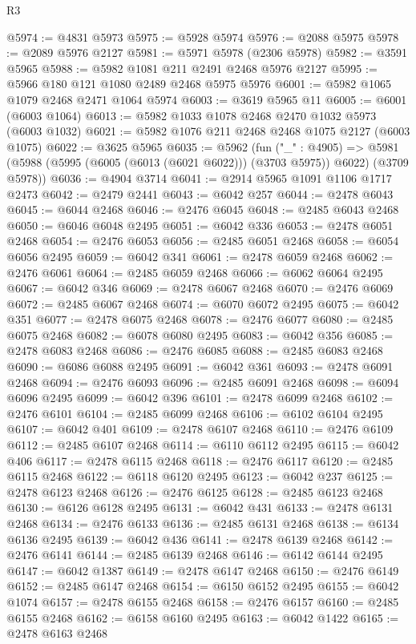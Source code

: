 \begin{lexlean}{R3}
\begin{coremodule}
@5974 := @4831 @5973
@5975 := @5928 @5974
@5976 := @2088 @5975
@5978 := @2089 @5976 @2127
@5981 := @5971 @5978 (@2306 @5978)
@5982 := @3591 @5965
@5988 := @5982 @1081 @211 @2491 @2468 @5976 @2127
@5995 := @5966 @180 @121 @1080 @2489 @2468 @5975 @5976
@6001 := @5982 @1065 @1079 @2468 @2471 @1064 @5974
@6003 := @3619 @5965 @11
@6005 := @6001 (@6003 @1064)
@6013 := @5982 @1033 @1078 @2468 @2470 @1032 @5973 (@6003 @1032)
@6021 := @5982 @1076 @211 @2468 @2468 @1075 @2127 (@6003 @1075)
@6022 := @3625 @5965
@6035 := @5962
    (fun ("_" : @4905) =>
    @5981 (@5988 (@5995 (@6005 (@6013 (@6021 @6022))) (@3703 @5975)) @6022) (@3709 @5978))
@6036 := @4904 @3714
@6041 := @2914 @5965 @1091 @1106 @1717 @2473
@6042 := @2479 @2441
@6043 := @6042 @257
@6044 := @2478 @6043
@6045 := @6044 @2468
@6046 := @2476 @6045
@6048 := @2485 @6043 @2468
@6050 := @6046 @6048 @2495
@6051 := @6042 @336
@6053 := @2478 @6051 @2468
@6054 := @2476 @6053
@6056 := @2485 @6051 @2468
@6058 := @6054 @6056 @2495
@6059 := @6042 @341
@6061 := @2478 @6059 @2468
@6062 := @2476 @6061
@6064 := @2485 @6059 @2468
@6066 := @6062 @6064 @2495
@6067 := @6042 @346
@6069 := @2478 @6067 @2468
@6070 := @2476 @6069
@6072 := @2485 @6067 @2468
@6074 := @6070 @6072 @2495
@6075 := @6042 @351
@6077 := @2478 @6075 @2468
@6078 := @2476 @6077
@6080 := @2485 @6075 @2468
@6082 := @6078 @6080 @2495
@6083 := @6042 @356
@6085 := @2478 @6083 @2468
@6086 := @2476 @6085
@6088 := @2485 @6083 @2468
@6090 := @6086 @6088 @2495
@6091 := @6042 @361
@6093 := @2478 @6091 @2468
@6094 := @2476 @6093
@6096 := @2485 @6091 @2468
@6098 := @6094 @6096 @2495
@6099 := @6042 @396
@6101 := @2478 @6099 @2468
@6102 := @2476 @6101
@6104 := @2485 @6099 @2468
@6106 := @6102 @6104 @2495
@6107 := @6042 @401
@6109 := @2478 @6107 @2468
@6110 := @2476 @6109
@6112 := @2485 @6107 @2468
@6114 := @6110 @6112 @2495
@6115 := @6042 @406
@6117 := @2478 @6115 @2468
@6118 := @2476 @6117
@6120 := @2485 @6115 @2468
@6122 := @6118 @6120 @2495
@6123 := @6042 @237
@6125 := @2478 @6123 @2468
@6126 := @2476 @6125
@6128 := @2485 @6123 @2468
@6130 := @6126 @6128 @2495
@6131 := @6042 @431
@6133 := @2478 @6131 @2468
@6134 := @2476 @6133
@6136 := @2485 @6131 @2468
@6138 := @6134 @6136 @2495
@6139 := @6042 @436
@6141 := @2478 @6139 @2468
@6142 := @2476 @6141
@6144 := @2485 @6139 @2468
@6146 := @6142 @6144 @2495
@6147 := @6042 @1387
@6149 := @2478 @6147 @2468
@6150 := @2476 @6149
@6152 := @2485 @6147 @2468
@6154 := @6150 @6152 @2495
@6155 := @6042 @1074
@6157 := @2478 @6155 @2468
@6158 := @2476 @6157
@6160 := @2485 @6155 @2468
@6162 := @6158 @6160 @2495
@6163 := @6042 @1422
@6165 := @2478 @6163 @2468

\end{coremodule}
\end{lexlean}
